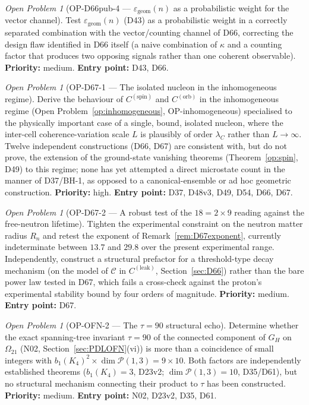 \documentclass[11pt,a4paper]{article}
\theoremstyle{plain}
\theoremstyle{definition}
\theoremstyle{remark}
\newtheorem{openproblem}[theorem]{Open Problem}
\begin{document}
\begin{openproblem}[OP-D66pub-4 --- $\varepsilon_{\mathrm{geom}}(n)$ as a probabilistic weight for the vector channel]
\label{op:D66pubfour}
Test $\varepsilon_{\mathrm{geom}}(n)$ (D43) as a probabilistic weight in a correctly separated combination with the vector/counting channel of D66, correcting the design flaw identified in D66 itself (a naive combination of $\kappa$ and a counting factor that produces two opposing signals rather than one coherent observable). \textbf{Priority:} medium. \textbf{Entry point:} D43, D66.
\end{openproblem}

\begin{openproblem}[OP-D67-1 --- The isolated nucleon in the inhomogeneous regime]
\label{op:D67one}
Derive the behaviour of $C^{(\mathrm{spin})}$ and $C^{(\mathrm{orb})}$ in the inhomogeneous regime (Open Problem~\ref{op:inhomogeneous}, OP-inhomogeneous) specialised to the physically important case of a single, bound, isolated nucleon, where the inter-cell coherence-variation scale $L$ is plausibly of order $\lambda_C$ rather than $L\to\infty$. Twelve independent constructions (D66, D67) are consistent with, but do not prove, the extension of the ground-state vanishing theorems (Theorem~\ref{op:spin}, D49) to this regime; none has yet attempted a direct microstate count in the manner of D37/BH-1, as opposed to a canonical-ensemble or ad hoc geometric construction. \textbf{Priority:} high. \textbf{Entry point:} D37, D48v3, D49, D54, D66, D67.
\end{openproblem}

\begin{openproblem}[OP-D67-2 --- A robust test of the $18=2\times9$ reading against the free-neutron lifetime]
\label{op:D67two}
Tighten the experimental constraint on the neutron matter radius $R_n$ and retest the exponent of Remark~\ref{rem:D67exponent}, currently indeterminate between $13.7$ and $29.8$ over the present experimental range. Independently, construct a structural prefactor for a threshold-type decay mechanism (on the model of $\mathcal C$ in $C^{(\mathrm{leak})}$, Section~\ref{sec:D66}) rather than the bare power law tested in D67, which fails a cross-check against the proton's experimental stability bound by four orders of magnitude. \textbf{Priority:} medium. \textbf{Entry point:} D67.
\end{openproblem}

\begin{openproblem}[OP-OFN-2 --- The $\tau=90$ structural echo]
\label{op:OFN2}
Determine whether the exact spanning-tree invariant $\tau=90$ of the connected component of $G_H$ on $\Omega_{21}$ (N02, Section~\ref{sec:PDLOFN}(vi)) is more than a coincidence of small integers with $b_1(K_4)^2\times\dim\mathcal P(1,3)=9\times10$. Both factors are independently established theorems ($b_1(K_4)=3$, D23v2; $\dim\mathcal P(1,3)=10$, D35/D61), but no structural mechanism connecting their product to $\tau$ has been constructed. \textbf{Priority:} medium. \textbf{Entry point:} N02, D23v2, D35, D61.
\end{openproblem}
\end{document}
